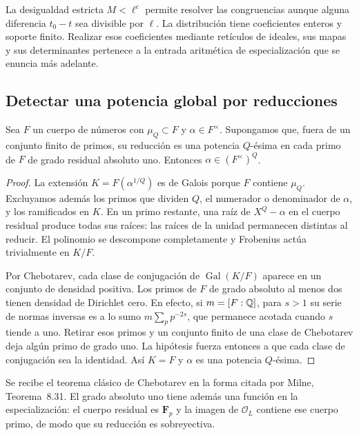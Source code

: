 La desigualdad estricta $M<\ell^c$ permite resolver las
congruencias aunque alguna diferencia $t_0-t$ sea divisible por
$\ell$. La distribución tiene coeficientes enteros y soporte
finito. Realizar esos coeficientes mediante retículos de ideales,
sus mapas y sus determinantes pertenece a la entrada aritmética
de especialización que se enuncia más adelante.

\subsection{Detectar una potencia global por reducciones}

\begin{lema}
\label{lem:cf-deteccion}
Sea $F$ un cuerpo de números con $\mu_Q\subset F$ y
$\alpha\in F^\times$. Supongamos que, fuera de un conjunto
finito de primos, su reducción es una potencia $Q$-ésima en
cada primo de $F$ de grado residual absoluto uno. Entonces
$\alpha\in(F^\times)^Q$.
\end{lema}

\begin{proof}
La extensión $K=F(\alpha^{1/Q})$ es de Galois porque $F$
contiene $\mu_Q$. Excluyamos además los primos que dividen $Q$,
el numerador o denominador de $\alpha$, y los ramificados en $K$.
En un primo restante, una raíz de $X^Q-\alpha$ en el cuerpo
residual produce todas sus raíces: las raíces de la unidad
permanecen distintas al reducir. El polinomio se descompone
completamente y Frobenius actúa trivialmente en $K/F$.

Por Chebotarev, cada clase de conjugación de
$\operatorname{Gal}(K/F)$ aparece en un conjunto de densidad
positiva. Los primos de $F$ de grado absoluto al menos dos
tienen densidad de Dirichlet cero. En efecto, si $m=[F:\mathbb{Q}]$,
para $s>1$ su serie de normas inversas es a lo sumo
$m\sum_p p^{-2s}$, que permanece acotada cuando $s$ tiende
a uno. Retirar esos primos y un conjunto finito de una clase
de Chebotarev deja algún primo de grado uno.
La hipótesis fuerza entonces a que cada clase de conjugación
sea la identidad. Así $K=F$ y $\alpha$ es una potencia $Q$-ésima.
\end{proof}

Se recibe el teorema clásico de Chebotarev en la forma citada
por Milne, Teorema~8.31. El grado absoluto uno tiene además
una función en la especialización: el cuerpo residual es
$\mathbf F_p$ y la imagen de $\mathcal O_L$ contiene ese cuerpo
primo, de modo que su reducción es sobreyectiva.

